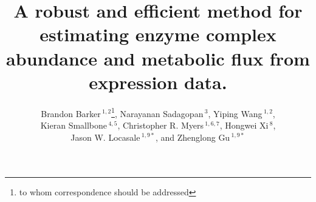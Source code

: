 \documentclass{bioinfo}
\begin{document}

\renewcommand{\figurename}{\textbf{Fig.}}
\captionsetup{belowskip=0pt}









\title[FALCON]{A robust and efficient method for estimating enzyme
complex abundance and metabolic flux from expression data.}
  \author[Barker \textit{et~al.}]{Brandon Barker\,$^{1,2}$\footnote{to whom correspondence should be addressed},
    Narayanan Sadagopan\,$^{3}$, Yiping Wang\,$^{1,2}$, \\
    Kieran Smallbone\,$^{4,5}$, Christopher R. Myers\,$^{1,6,7}$, Hongwei Xi\,$^{8}$, \\ 
    Jason W. Locasale\,$^{1,9*}$, and Zhenglong Gu\,$^{1,9*}$\\
 }

\address{$^{1}$Tri-Institutional Training Program in Computational
  Biology and Medicine, 1300 York Avenue, Box 194, New York, NY, USA.
  $^{2}$Department of Biological Statistics and Computational Biology, 
    Cornell University, 1198 Comstock Hall, Ithaca, NY, USA.
  $^{3}$College of Engineering, Cornell University, Carpenter Hall, 
    Ithaca, NY, USA.
  $^{4}$ School of Computer Science, The University of Manchester, Manchester, UK.
  $^{5}$Manchester Center for Integrative Systems Biology, The University of Manchester, Manchester, UK.
  $^{6}$Laboratory of Atomic and Solid State Physics, Physical Sciences Building,
    Cornell University, Ithaca, NY, USA.
  $^{7}$Life Sciences Core Laboratories Center, Cornell University, 
    Ithaca, NY, USA.
  $^{8}$Department of Computer Science, Boston University,
    111 Cummington Street, Boston, MA, USA.
  $^{9}$Division of Nutritional Sciences, Cornell University, 
    Savage Hall, Ithaca, NY, USA.
  }
\end{document}
